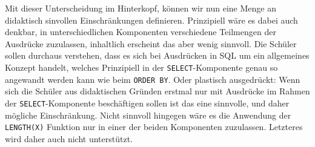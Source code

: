 Mit dieser Unterscheidung im Hinterkopf, können wir nun eine Menge an didaktisch sinvollen Einschränkungen definieren. Prinzipiell wäre es dabei auch denkbar, in unterschiedlichen Komponenten verschiedene Teilmengen der Ausdrücke zuzulassen, inhaltlich erscheint das aber wenig sinnvoll. Die Schüler sollen durchaus verstehen, dass es sich bei Ausdrücken in SQL um ein allgemeines Konzept handelt, welches Prinzipiell in der \texttt{SELECT}-Komponente genau so angewandt werden kann wie beim \texttt{ORDER BY}. Oder plastisch ausgedrückt: Wenn sich die Schüler aus didaktischen Gründen erstmal nur mit Ausdrücke im Rahmen der \texttt{SELECT}-Komponente beschäftigen sollen ist das eine sinnvolle, und daher mögliche Einschränkung. Nicht sinnvoll hingegen wäre es die Anwendung der \texttt{LENGTH(X)} Funktion nur in einer der beiden Komponenten zuzulassen. Letzteres wird daher auch nicht unterstützt.

